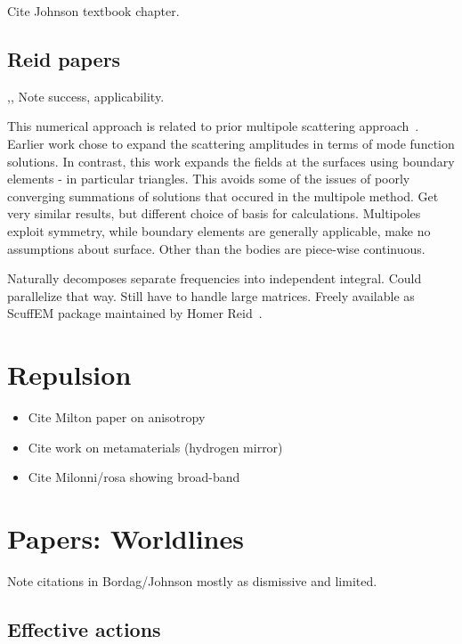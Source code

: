 Cite Johnson textbook chapter.\cite{Johnson2011}

\subsection{Reid papers}

\cite{Reid2009},\cite{Reid2011}, \cite{Reid2013} 
Note success, applicability.  

This numerical approach is related to prior multipole scattering approach~\cite{Rahi2009}.
Earlier work chose to expand the scattering amplitudes in terms of mode function
solutions.  In contrast, this work expands the fields at the surfaces using 
boundary elements - in particular triangles.  
This avoids some of the issues of poorly converging summations of solutions that occured in
the multipole method.  Get very similar results, but different choice of basis for calculations.
Multipoles exploit symmetry, while boundary elements are generally applicable, make no assumptions 
about surface.  Other than the bodies are piece-wise continuous.  

Naturally decomposes separate frequencies into independent integral.  Could parallelize that way.
Still have to handle large matrices.  Freely available as ScuffEM package maintained by
 Homer Reid~\cite{ScuffEM2016}.  

\section{Repulsion}

\begin{itemize}
\item Cite Milton paper on anisotropy \cite{Milton2012, Milton2012a}
\item Cite work on metamaterials (hydrogen mirror)
\item Cite Milonni/rosa showing broad-band \cite{Rosa2010}
\end{itemize}

\section{Papers: Worldlines}

Note citations in Bordag/Johnson mostly as dismissive and limited.  

\subsection{Effective actions}


